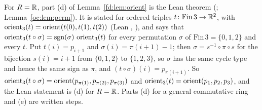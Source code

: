 \begin{remark}\label{fd:rem:orient-lean}\sloppy
For $R=\mathbb R$, part (d) of Lemma~\ref{fd:lem:orient} is the Lean theorem
 (;
Lemma~\ref{oc:lem:perm}). It is stated for ordered triples $t\colon\mathrm{Fin}\,3\to\mathbb R^2$, with
$\operatorname{orient}_3(t)=\operatorname{orient}(t(0),t(1),t(2))$ (Lean ,
), and says that
$\operatorname{orient}_3(t\circ\sigma)=\operatorname{sgn}(\sigma)\,\operatorname{orient}_3(t)$ for every permutation $\sigma$ of
$\mathrm{Fin}\,3=\{0,1,2\}$ and every $t$. Put $t(i)=p_{i+1}$ and $\sigma(i)=\pi(i+1)-1$; then
$\sigma=s^{-1}\circ\pi\circ s$ for the bijection $s(i)=i+1$ from $\{0,1,2\}$ to $\{1,2,3\}$, so $\sigma$
has the same cycle type and hence the same sign as $\pi$, and $(t\circ\sigma)(i)=p_{\pi(i+1)}$. So
$\operatorname{orient}_3(t\circ\sigma)=\operatorname{orient}(p_{\pi(1)},p_{\pi(2)},p_{\pi(3)})$ and $\operatorname{orient}_3(t)=\operatorname{orient}(p_1,p_2,p_3)$,
and the Lean statement is (d) for $R=\mathbb R$. Parts (d) for a general commutative ring and (e) are written
steps.
\end{remark}

